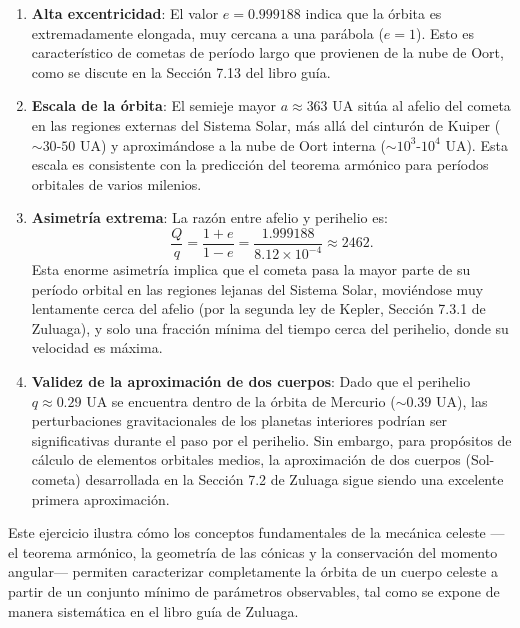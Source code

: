 \documentclass[12pt, a4paper]{article}
\begin{document}
\begin{enumerate}
    \item \textbf{Alta excentricidad}: El valor $e = 0.999188$ indica que la órbita es extremadamente elongada, muy cercana a una parábola ($e=1$). Esto es característico de cometas de período largo que provienen de la nube de Oort, como se discute en la Sección 7.13 del libro guía.
    
    \item \textbf{Escala de la órbita}: El semieje mayor $a \approx 363$ UA sitúa al afelio del cometa en las regiones externas del Sistema Solar, más allá del cinturón de Kuiper ($\sim 30$-$50$ UA) y aproximándose a la nube de Oort interna ($\sim 10^3$-$10^4$ UA). Esta escala es consistente con la predicción del teorema armónico para períodos orbitales de varios milenios.
    
    \item \textbf{Asimetría extrema}: La razón entre afelio y perihelio es:
    $$\frac{Q}{q} = \frac{1+e}{1-e} = \frac{1.999188}{8.12 \times 10^{-4}} \approx 2462.$$
    Esta enorme asimetría implica que el cometa pasa la mayor parte de su período orbital en las regiones lejanas del Sistema Solar, moviéndose muy lentamente cerca del afelio (por la segunda ley de Kepler, Sección 7.3.1 de Zuluaga), y solo una fracción mínima del tiempo cerca del perihelio, donde su velocidad es máxima.
    
    \item \textbf{Validez de la aproximación de dos cuerpos}: Dado que el perihelio $q \approx 0.29$ UA se encuentra dentro de la órbita de Mercurio ($\sim 0.39$ UA), las perturbaciones gravitacionales de los planetas interiores podrían ser significativas durante el paso por el perihelio. Sin embargo, para propósitos de cálculo de elementos orbitales medios, la aproximación de dos cuerpos (Sol-cometa) desarrollada en la Sección 7.2 de Zuluaga sigue siendo una excelente primera aproximación.
\end{enumerate}

Este ejercicio ilustra cómo los conceptos fundamentales de la mecánica celeste —el teorema armónico, la geometría de las cónicas y la conservación del momento angular— permiten caracterizar completamente la órbita de un cuerpo celeste a partir de un conjunto mínimo de parámetros observables, tal como se expone de manera sistemática en el libro guía de Zuluaga.
\end{document}
